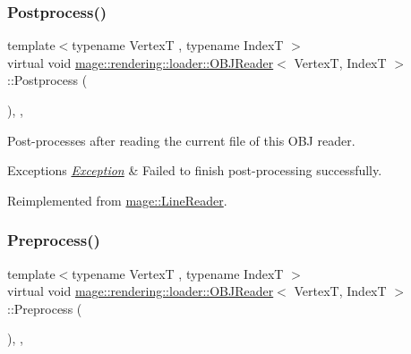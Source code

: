 \subsubsection{\texorpdfstring{Postprocess()}{Postprocess()}}
{\footnotesize\ttfamily template$<$typename VertexT , typename IndexT $>$ \\
virtual void \mbox{\hyperlink{classmage_1_1rendering_1_1loader_1_1_o_b_j_reader}{mage\+::rendering\+::loader\+::\+O\+B\+J\+Reader}}$<$ VertexT, IndexT $>$\+::Postprocess (\begin{DoxyParamCaption}{ }\end{DoxyParamCaption})\hspace{0.3cm}{\ttfamily [override]}, {\ttfamily [private]}, {\ttfamily [virtual]}}

Post-\/processes after reading the current file of this O\+BJ reader.


\begin{DoxyExceptions}{Exceptions}
{\em \mbox{\hyperlink{classmage_1_1_exception}{Exception}}} & Failed to finish post-\/processing successfully. \\
\hline
\end{DoxyExceptions}


Reimplemented from \mbox{\hyperlink{classmage_1_1_line_reader_a51775e07b5f7c9f72441e42d6d3896e1}{mage\+::\+Line\+Reader}}.

\mbox{\label{classmage_1_1rendering_1_1loader_1_1_o_b_j_reader_ad082a6295259f7e8af2c60c182ea55d3}} 
\subsubsection{\texorpdfstring{Preprocess()}{Preprocess()}}
{\footnotesize\ttfamily template$<$typename VertexT , typename IndexT $>$ \\
virtual void \mbox{\hyperlink{classmage_1_1rendering_1_1loader_1_1_o_b_j_reader}{mage\+::rendering\+::loader\+::\+O\+B\+J\+Reader}}$<$ VertexT, IndexT $>$\+::Preprocess (\begin{DoxyParamCaption}{ }\end{DoxyParamCaption})\hspace{0.3cm}{\ttfamily [override]}, {\ttfamily [private]}, {\ttfamily [virtual]}}


